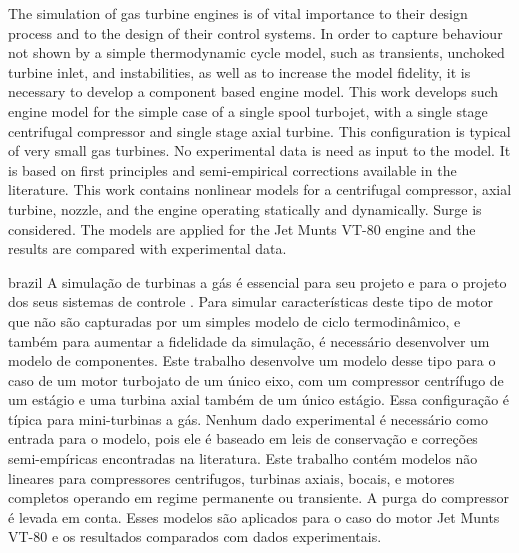 
\setlength{\absparsep}{18pt} %
\begin{resumo}
    The simulation of gas turbine engines is of vital importance to their design process and to the design of their control systems.
    In order to capture behaviour not shown by a simple thermodynamic cycle model, such as transients, unchoked turbine inlet, and instabilities, 
    as well as to increase the model fidelity, it is necessary to develop a component based engine model. 
    This work develops such engine model  for the simple case of a single spool turbojet, 
    with a single stage centrifugal compressor and single stage axial turbine. This configuration is typical of very small gas turbines.
    No experimental data is need as input to the model. It is based on first principles and semi-empirical corrections available in the literature.
    This work contains nonlinear models for a centrifugal compressor, axial turbine, nozzle, and the engine operating statically and dynamically.
    Surge is considered. The models are applied for the Jet Munts VT-80 engine and the results are compared with experimental data.

\end{resumo}

\begin{resumo}[Resumo]
 \begin{otherlanguage*}{brazil}
     A simulação de turbinas a gás é essencial para seu projeto e para o projeto dos seus sistemas de controle .
     Para simular características deste tipo de motor que não são capturadas por um simples modelo de ciclo termodinâmico, 
     e também para aumentar a fidelidade da simulação, é necessário desenvolver um modelo de componentes.
     Este trabalho desenvolve um modelo desse tipo para o caso de um motor turbojato de um único eixo, 
     com um compressor centrífugo de um estágio e uma turbina axial também de um único estágio.
     Essa configuração é típica para mini-turbinas a gás.
     Nenhum dado experimental é necessário como entrada para o modelo, pois ele é baseado em leis de conservação e correções semi-empíricas encontradas na literatura.
     Este trabalho contém modelos não lineares para compressores centrifugos, turbinas axiais, bocais, e motores completos operando em regime permanente ou transiente.
     A purga do compressor é levada em conta. Esses modelos são aplicados para o caso do motor Jet Munts VT-80 e os resultados comparados com dados experimentais.
     
   \noindent 
 \end{otherlanguage*}
\end{resumo}

